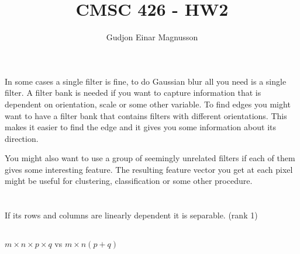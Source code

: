 \documentclass[12pt]{article}
\begin{document}
\title{CMSC 426 - HW2}
\author{Gudjon Einar Magnusson}

\maketitle

\section{}

In some cases a single filter is fine, to do Gaussian blur all you need is a single filter. A filter bank is needed if you want to capture information that is dependent on orientation, scale or some other variable. To find edges you might want to have a filter bank that contains filters with different orientations. This makes it easier to find the edge and it gives you some information about its direction.

You might also want to use a group of seemingly unrelated filters if each of them gives some interesting feature. The resulting feature vector you get at each pixel might be useful for clustering, classification or some other procedure.

\section{}

\subsection{} %
If its rows and columns are linearly dependent it is separable. (rank 1)


\subsection{} %
$m \times n \times p \times q$ vs $m \times n ( p + q)$

\subsection{} %

\subsection{} %

\section{}

\section{}

\section{}

\section{}
\end{document}
